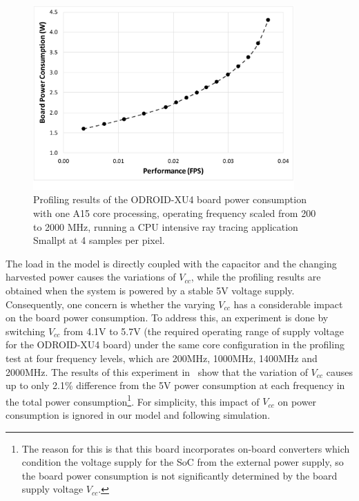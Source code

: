 \begin{figure} [!tb]
    \centering
    \includegraphics[width=10cm]{figure/work2/pvs11}
    \caption{Profiling results of the ODROID-XU4 board power consumption with one A15 core processing, operating frequency scaled from 200 to 2000 MHz, running a CPU intensive ray tracing application Smallpt at 4 samples per pixel.}
    \label{Figure:pvs11}
\end{figure} 

The load in the model is directly coupled with the capacitor and the changing harvested power causes the variations of $V_{cc}$, while the profiling results are obtained when the system is powered by a stable 5V voltage supply. Consequently, one concern is whether the varying $V_{cc}$ has a considerable impact on the board power consumption. To address this, an experiment is done by switching $V_{cc}$ from 4.1V to 5.7V (the required operating range of supply voltage for the ODROID-XU4 board) under the same core configuration in the profiling test at four frequency levels, which are 200MHz, 1000MHz, 1400MHz and 2000MHz. The results of this experiment in~ show that the variation of $V_{cc}$ causes up to only 2.1\% difference from the 5V power consumption at each frequency in the total power consumption\footnote{The reason for this is that this board incorporates on-board converters which condition the voltage supply for the SoC from the external power supply, so the board power consumption is not significantly determined by the board supply voltage $V_{cc}$.}. For simplicity, this impact of $V_{cc}$ on power consumption is ignored in our model and following simulation. 

